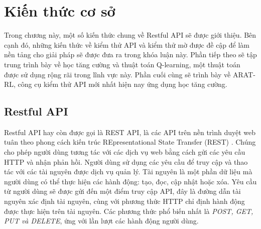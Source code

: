 
\chapter{Kiến thức cơ sở}
Trong chương này, một số kiến thức chung về Restful API sẽ được giới thiệu. Bên cạnh đó, những kiến thức  về kiểm thử API và kiểm thử mờ được đề cập để làm nền tảng cho giải pháp sẽ được đưa ra trong khóa luận này. Phần tiếp theo sẽ tập trung trình bày về học tăng cường và thuật toán Q-learning, một thuật toán được sử dụng rộng rãi trong lĩnh vực này. Phần cuối cùng sẽ trình bày về ARAT-RL, công cụ kiểm thử API mới nhất hiện nay ứng dụng học tăng cường.
\section{Restful API}
Restful API hay còn được gọi là REST API, là các API trên nền trình duyệt web tuân theo phong cách kiến trúc REpresentational State Transfer (REST) \cite{RESTAPI}. Chúng cho phép người dùng tương tác với các dịch vụ web bằng cách gửi các yêu cầu HTTP và nhận phản hồi. Người dùng sử dụng các yêu cầu để truy cập và thao tác với các tài nguyên được dịch vụ quản lý. Tài nguyên là một phần dữ liệu mà người dùng có thể thực hiện các hành động: tạo, đọc, cập nhật hoặc xóa.
Yêu cầu từ người dùng sẽ được gửi đến một điểm truy cập API, đây là đường dẫn tài nguyên xác định tài nguyên, cùng với phương thức HTTP chỉ định hành động được thực hiện trên tài nguyên. Các phương thức phổ biến nhất là \textit{POST, GET, PUT và DELETE}, ứng với lần lượt các hành động người dùng.


